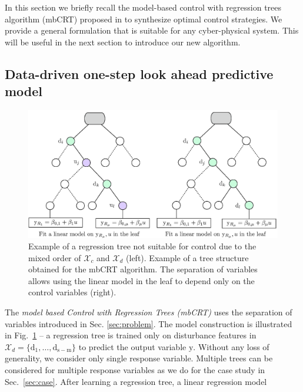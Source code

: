 
In this section we briefly recall the model-based control with regression trees algorithm (mbCRT) proposed in \cite{Behl201630} to synthesize optimal control strategies. 
We provide a general formulation that is suitable for any cyber-physical system.
This will be useful in the next section to introduce our new algorithm. 

\subsection{Data-driven one-step look ahead predictive model}
\label{sec:mbcrt}

\begin{figure}
\centering
\includegraphics[width=0.9\columnwidth]{Figures/sep_vars.eps}
   \caption{Example of a regression tree not suitable for control due to the mixed order of $\mathcal{X}_c$ and $\mathcal{X}_d$ (left). Example of a tree structure obtained for the mbCRT algorithm. The separation of variables allows using the linear model in the leaf to depend only on the control variables (right).}
   \captionsetup{justification=centering}
   \label{fig:training}
\end{figure}

The \emph{model based Control with Regression Trees (mbCRT)} uses the separation of variables introduced in Sec. \ref{sec:problem}.
The model construction is illustrated in Fig.~\ref{fig:training} -- a regression tree is trained only on disturbance features in $\mathcal{X}_d= \{ \mathrm{d_1,\ldots,d_{s-m}} \} $ to predict the output variable $\mathrm{y}$. Without any loss of generality, we consider only single response variable. 
Multiple trees can be considered for multiple response variables as we do for the case study in Sec.~\ref{sec:case}. 
After learning a regression tree, a linear regression model

